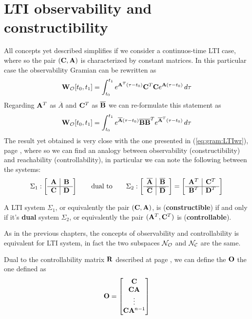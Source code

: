 \section{LTI observability and constructibility}
	All concepts yet described simplifies if we consider a continuos-time LTI case, where so the pair $(\mathbf{C},\mathbf{A})$ is characterized by constant matrices. In this particular case the observability Gramian can be rewritten as
	\[ \mathbf{W}_{\mathcal O}[t_0,t_1] = \int_{t_0}^{t_1} e^{\mathbf{A}^T(\tau-t_0)} \mathbf{C}^T\mathbf{C} e^{\mathbf{A}(\tau- t_0)} \, d\tau \]
	Regarding $\mathbf{A}^T$ as $\overline A$ and $\mathbf{C}^T$ as $\overline {\mathbf{B}}$ we can re-formulate this statement as
	\[ \mathbf{W}_{\mathcal O}[t_0,t_1] = \int_{t_0}^{t_1} e^{\overline {\mathbf{A}}(\tau-t_0)} \overline {\mathbf{B}} \overline {\mathbf{B}}^T e^{\overline {\mathbf{A}}^T(\tau- t_0)} \, d\tau \]
	The result yet obtained is very close with the one presented in (\ref{eq:gram:LTIwr}), page \pageref{eq:gram:LTIwr}, where so we can find an analogy between observability (constructibility) and reachability (controllability), in particular we can note the following  between the systems:
	\[ \Sigma_1: \begin{bmatrix} \begin{array}{c|c}
			\mathbf{A} &  \mathbf{B} \\ \hline \mathbf{C} & \mathbf{D}
	\end{array} \end{bmatrix} \qquad \textrm{dual to} \qquad \Sigma_2:\begin{bmatrix} \begin{array}{c|c}
		\overline {\mathbf{A}} & \overline {\mathbf{B}} \\ \hline \overline {\mathbf{C}} & \overline {\mathbf{D}}
	\end{array} \end{bmatrix} = \begin{bmatrix} \begin{array}{c|c}
		\mathbf{A}^T &  \mathbf{C}^T \\ \hline \mathbf{B}^T & \mathbf{D}^T
	\end{array} \end{bmatrix} \]
	\begin{theorem}
		A LTI system $\Sigma_1$, or equivalently the pair $(\mathbf{C},\mathbf{A})$, is  (\textbf{constructible}) if and only if it's \textbf{dual} system $\Sigma_2$, or equivalently the pair $(\mathbf{A}^T,\mathbf{C}^T)$ is  (\textbf{controllable}).
	\end{theorem}
	As in the previous chapters, the concepts of observability and controllability is equivalent for LTI system, in fact the two subspaces $\mathcal{N_O}$ and $\mathcal{N_C}$ are the same.
	
	Dual to the controllability matrix $\mathbf{R}$ described at page \pageref{eq:gram:reachabilitymatrix}, we can define the  $\mathbf{O}$ the one defined as
	\begin{equation}
		\mathbf{O} = \begin{bmatrix} \mathbf{C} \\ \mathbf{C} \mathbf{A} \\ \vdots \\ \mathbf{C}\mathbf{A}^{n-1} \end{bmatrix}
	\end{equation}
	

